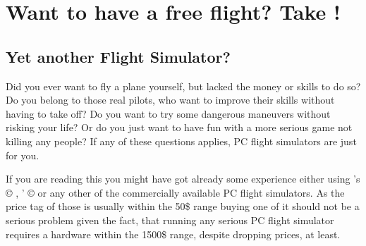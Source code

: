 
\chapter{Want to have a free flight? Take {\FlightGear}!\label{free}}

\section{Yet another Flight Simulator?}

Did you ever want to fly a plane yourself, but lacked the money or
skills to do so? Do you belong to those real pilots, who want to
improve their skills without having to take off? Do you want to
try some dangerous maneuvers without risking your life? Or do you
just want to have fun with a more serious game not killing any
people? If any of these questions applies, PC flight simulators
are just for you.

If you are reading this you might have got already some experience
either using 's {\copyright} ,
' {\copyright}  or any
other of the commercially available PC flight simulators. As the price
tag of those is usually within the 50\$ range buying one of it should
not be a serious problem given the fact, that running any serious PC
flight simulator requires a hardware within the 1500\$ range, despite
dropping prices, at least.

